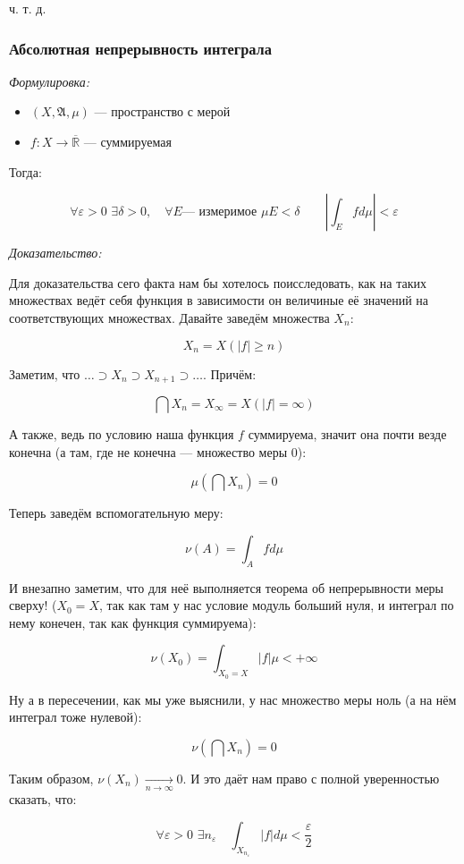 \documentclass{article}
\def\dbl{\,\,}
\def\rinf{\overline{\mathbb{R}}}
\def\goesto#1{\underset{#1}{\longrightarrow}}
\def\toinf#1{\goesto{#1 \rightarrow \infty}}
\def\ntoinf{\toinf{n}}
\begin{document}
ч. т. д. 

\subsubsection{Абсолютная непрерывность интеграла}
\textit{Формулировка:}

\begin{itemize}
    \item $(X, \mathfrak{A}, \mu)$ --- пространство с мерой
    \item $f: X \rightarrow \rinf$ --- суммируемая
\end{itemize}

Тогда:

\[\forall \varepsilon > 0 \dbl \exists \delta > 0, \quad \forall E\text{--- измеримое} \dbl \mu E < \delta \qquad \left|\int_{E} f d \mu\right| < \varepsilon\]

\textit{Доказательство:}

Для доказательства сего факта нам бы хотелось поисследовать, как на таких множествах ведёт себя функция в зависимости он величиные её значений на соответствующих множествах. Давайте заведём множества $X_n$:

\[X_n = X(|f| \ge n)\]

Заметим, что $\ldots \supset X_n \supset X_{n + 1} \supset \ldots$. Причём:

\[\bigcap X_n = X_{\infty} = X(|f| = \infty)\]

А также, ведь по условию наша функция $f$ суммируема, значит она почти везде конечна (а там, где не конечна --- множество меры 0):

\[\mu \left( \bigcap X_n \right) = 0\]

Теперь заведём вспомогательную меру:

\[ \nu(A) = \int_{A} f d\mu\]

И внезапно заметим, что для неё выполняется теорема об непрерывности меры сверху! ($X_0 = X$, так как там у нас условие модуль больший нуля, и интеграл по нему конечен, так как функция суммируема):

\[\nu(X_0) = \int_{X_0 = X} |f| \mu < +\infty\]

Ну а в пересечении, как мы уже выяснили, у нас множество меры ноль (а на нём интеграл тоже нулевой):

\[\nu\left( \bigcap X_n \right) = 0\]

Таким образом, $\nu(X_n) \ntoinf 0$. И это даёт нам право с полной уверенностью сказать, что:

\[\forall \varepsilon > 0 \dbl \exists n_\varepsilon \quad \int_{X_{n_\varepsilon}} |f| d\mu < \frac{\varepsilon}{2}\]
\end{document}
